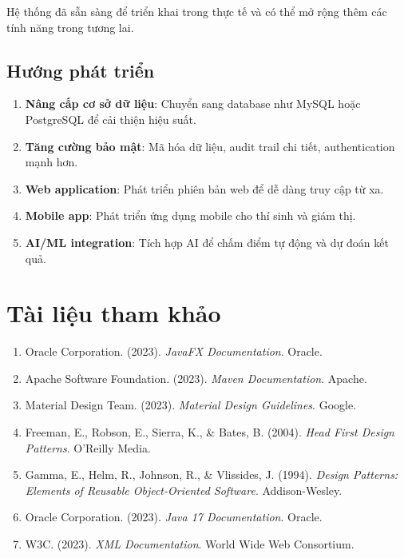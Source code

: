 \documentclass[12pt,a4paper]{article}
\begin{document}
Hệ thống đã sẵn sàng để triển khai trong thực tế và có thể mở rộng thêm các tính năng trong tương lai.

\subsection{Hướng phát triển}

\begin{enumerate}
    \item \textbf{Nâng cấp cơ sở dữ liệu}: Chuyển sang database như MySQL hoặc PostgreSQL để cải thiện hiệu suất.
    
    \item \textbf{Tăng cường bảo mật}: Mã hóa dữ liệu, audit trail chi tiết, authentication mạnh hơn.
    
    \item \textbf{Web application}: Phát triển phiên bản web để dễ dàng truy cập từ xa.
    
    \item \textbf{Mobile app}: Phát triển ứng dụng mobile cho thí sinh và giám thị.
    
    \item \textbf{AI/ML integration}: Tích hợp AI để chấm điểm tự động và dự đoán kết quả.
\end{enumerate}

\section{Tài liệu tham khảo}

\begin{enumerate}
    \item Oracle Corporation. (2023). \textit{JavaFX Documentation}. Oracle.
    
    \item Apache Software Foundation. (2023). \textit{Maven Documentation}. Apache.
    
    \item Material Design Team. (2023). \textit{Material Design Guidelines}. Google.
    
    \item Freeman, E., Robson, E., Sierra, K., \& Bates, B. (2004). \textit{Head First Design Patterns}. O'Reilly Media.
    
    \item Gamma, E., Helm, R., Johnson, R., \& Vlissides, J. (1994). \textit{Design Patterns: Elements of Reusable Object-Oriented Software}. Addison-Wesley.
    
    \item Oracle Corporation. (2023). \textit{Java 17 Documentation}. Oracle.
    
    \item W3C. (2023). \textit{XML Documentation}. World Wide Web Consortium.
\end{enumerate}
\end{document}
